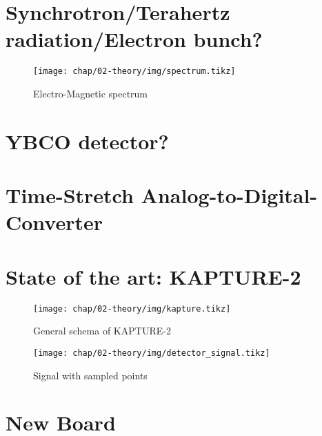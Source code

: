 \section{Synchrotron/Terahertz radiation/Electron bunch?}
\begin{figure}[H]
	\centering
	\texttt{[image: chap/02-theory/img/spectrum.tikz]}
	\caption{Electro-Magnetic spectrum}
	\label{fig:spectrum}
\end{figure}

\section{YBCO detector?}
\section{Time-Stretch Analog-to-Digital-Converter}

 \section{State of the art: KAPTURE-2}
 
\begin{figure}[H]
	\centering
	\texttt{[image: chap/02-theory/img/kapture.tikz]}
	\caption{General schema of KAPTURE-2}
	\label{fig:kapture}
\end{figure}

\begin{figure}[H]
	\centering
	\texttt{[image: chap/02-theory/img/detector\_signal.tikz]}
	\caption{Signal with sampled points}
	\label{fig:detector_signal}
\end{figure}

\newpage
 \section{New Board}